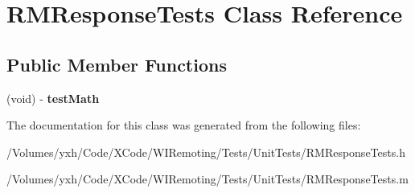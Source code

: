 \hypertarget{interface_r_m_response_tests}{
\section{RMResponseTests Class Reference}
\label{interface_r_m_response_tests}
}
\subsection*{Public Member Functions}
\begin{DoxyCompactItemize}
\item 
\hypertarget{interface_r_m_response_tests_a6d2096ae1674d0a0f7407df400a53782}{
(void) -\/ {\bfseries testMath}}
\label{interface_r_m_response_tests_a6d2096ae1674d0a0f7407df400a53782}

\end{DoxyCompactItemize}


The documentation for this class was generated from the following files:\begin{DoxyCompactItemize}
\item 
/Volumes/yxh/Code/XCode/WIRemoting/Tests/UnitTests/RMResponseTests.h\item 
/Volumes/yxh/Code/XCode/WIRemoting/Tests/UnitTests/RMResponseTests.m\end{DoxyCompactItemize}
